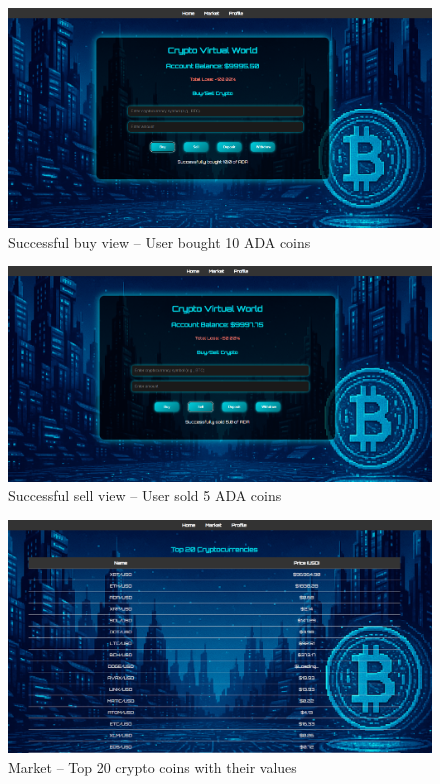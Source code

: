 \documentclass[a4paper,12pt]{article}
\begin{document}
\begin{figure}[H]
    \centering
    \includegraphics[width=1.0\textwidth]{buy.png}
    \caption{Successful buy view – User bought 10 ADA coins}
\end{figure}

\begin{figure}[H]
    \centering
    \includegraphics[width=1.0\textwidth]{sell.png}
    \caption{Successful sell view – User sold 5 ADA coins}
\end{figure}

\begin{figure}[H]
    \centering
    \includegraphics[width=1.0\textwidth]{market.png}
    \caption{Market – Top 20 crypto coins with their values}
\end{figure}
\end{document}
